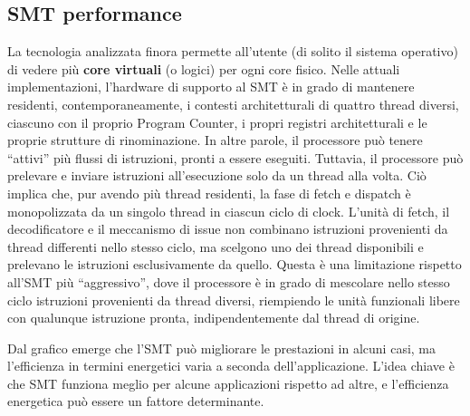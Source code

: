 \subsection{SMT performance}
La tecnologia analizzata finora permette all'utente (di solito il sistema operativo) di vedere più \textbf{core virtuali} (o logici) per ogni core fisico. 
Nelle attuali implementazioni, l'hardware di supporto al SMT è in grado di mantenere residenti, contemporaneamente, i contesti architetturali di quattro thread diversi, ciascuno con il proprio Program Counter, i propri registri architetturali e le proprie strutture di rinominazione. In altre parole, il processore può tenere “attivi” più flussi di istruzioni, pronti a essere eseguiti. Tuttavia, il processore può prelevare e inviare istruzioni all'esecuzione solo da un thread alla volta. Ciò implica che, pur avendo più thread residenti, la fase di fetch e dispatch è monopolizzata da un singolo thread in ciascun ciclo di clock. L'unità di fetch, il decodificatore e il meccanismo di issue non combinano istruzioni provenienti da thread differenti nello stesso ciclo, ma scelgono uno dei thread disponibili e prelevano le istruzioni esclusivamente da quello. Questa è una limitazione rispetto all'SMT più “aggressivo”, dove il processore è in grado di mescolare nello stesso ciclo istruzioni provenienti da thread diversi, riempiendo le unità funzionali libere con qualunque istruzione pronta, indipendentemente dal thread di origine.

\begin{figure}[ht]
    \centering
    \setlength{\fboxrule}{0.5pt} %
    \setlength{\fboxsep}{0pt}    %
\end{figure}

Dal grafico emerge che l'SMT può migliorare le prestazioni in alcuni casi, ma l'efficienza in termini energetici varia a seconda dell'applicazione. L'idea chiave è che SMT funziona meglio per alcune applicazioni rispetto ad altre, e l'efficienza energetica può essere un fattore determinante.
